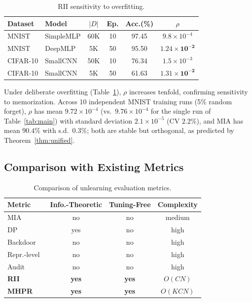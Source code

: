 \documentclass[smallextended]{svjour3}       %
\begin{document}
\begin{table}[t]
\centering
\small
\caption{RII sensitivity to overfitting.}\label{tab:sensitivity}
\setlength{\tabcolsep}{2pt}
\begin{tabular}{l l c c c c}
\toprule
Dataset & Model & $|D|$ & Ep. & Acc.(\%) & $\rho$ \\
\midrule
MNIST   & SimpleMLP & 60K & 10  & 97.45 & $9.8{\times}10^{-4}$ \\
MNIST   & DeepMLP & 5K & 50 & 95.50 & $\mathbf{1.24{\times}10^{-2}}$ \\
CIFAR-10 & SmallCNN & 50K & 10  & 76.34 & $1.5{\times}10^{-3}$ \\
CIFAR-10 & SmallCNN & 5K & 50 & 61.63 & $\mathbf{1.31{\times}10^{-2}}$ \\
\bottomrule
\end{tabular}
\end{table}

Under deliberate overfitting (Table~\ref{tab:sensitivity}), $\rho$ increases tenfold, confirming sensitivity to memorization. Across 10 independent MNIST training runs (5\% random forget), $\rho$ has mean $9.72{\times}10^{-4}$ (vs.\ $9.76{\times}10^{-4}$ for the single run of Table~\ref{tab:main}) with standard deviation $2.1{\times}10^{-5}$ (CV $2.2\%$), and MIA has mean $90.4\%$ with s.d.\ $0.3\%$; both are stable but orthogonal, as predicted by Theorem~\ref{thm:unified}.

\subsection{Comparison with Existing Metrics}

\begin{table}[t]
\centering
\caption{Comparison of unlearning evaluation metrics.}\label{tab:metric_compare}
\setlength{\tabcolsep}{3pt}
\begin{tabular}{l c c c}
\toprule
Metric & Info.-Theoretic & Tuning-Free & Complexity \\
\midrule
MIA~\cite{shokri2017membership} & no & no & medium \\
DP~\cite{guo2020certified} & yes & no & high \\
Backdoor~\cite{sommer2022towards} & no & no & high \\
Repr.-level~\cite{cosma2026ruler} & no & no & high \\
Audit~\cite{ye2026auditing} & no & no & high \\
\textbf{RII} & \textbf{yes} & \textbf{yes} & $O(CN)$ \\
\textbf{MHPR} & \textbf{yes} & \textbf{yes} & $O(KCN)$ \\
\bottomrule
\end{tabular}
\end{table}
\end{document}
